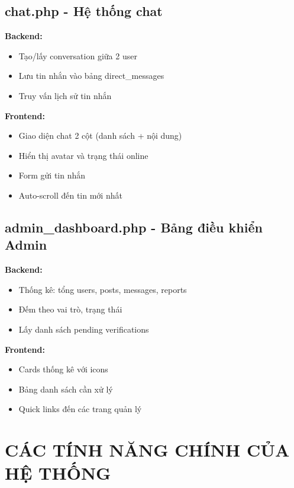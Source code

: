 \documentclass[a4paper,12pt]{article}
\begin{document}
\subsection{chat.php - Hệ thống chat}

\textbf{Backend:}
\begin{itemize}
    \item Tạo/lấy conversation giữa 2 user
    \item Lưu tin nhắn vào bảng direct\_messages
    \item Truy vấn lịch sử tin nhắn
\end{itemize}

\textbf{Frontend:}
\begin{itemize}
    \item Giao diện chat 2 cột (danh sách + nội dung)
    \item Hiển thị avatar và trạng thái online
    \item Form gửi tin nhắn
    \item Auto-scroll đến tin mới nhất
\end{itemize}

\subsection{admin\_dashboard.php - Bảng điều khiển Admin}

\textbf{Backend:}
\begin{itemize}
    \item Thống kê: tổng users, posts, messages, reports
    \item Đếm theo vai trò, trạng thái
    \item Lấy danh sách pending verifications
\end{itemize}

\textbf{Frontend:}
\begin{itemize}
    \item Cards thống kê với icons
    \item Bảng danh sách cần xử lý
    \item Quick links đến các trang quản lý
\end{itemize}

\section{CÁC TÍNH NĂNG CHÍNH CỦA HỆ THỐNG}
\end{document}
